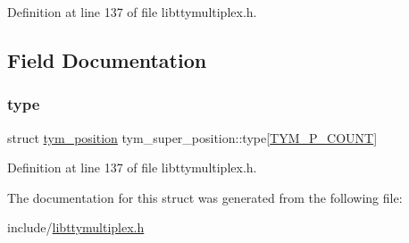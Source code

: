 Definition at line 137 of file libttymultiplex.\+h.



\subsection{Field Documentation}
\mbox{\label{structtym__super__position_af5baedeebbc4d01a742503cf0536617c}} 
\subsubsection{\texorpdfstring{type}{type}}
{\footnotesize\ttfamily struct \hyperlink{structtym__position}{tym\+\_\+position} tym\+\_\+super\+\_\+position\+::type\mbox{[}\hyperlink{libttymultiplex_8h_a23b539c9dc1c137633f8783517fc2653a483bfa59d0a2b43731d992c418a42db7}{T\+Y\+M\+\_\+\+P\+\_\+\+C\+O\+U\+NT}\mbox{]}}



Definition at line 137 of file libttymultiplex.\+h.



The documentation for this struct was generated from the following file\+:\begin{DoxyCompactItemize}
\item 
include/\hyperlink{libttymultiplex_8h}{libttymultiplex.\+h}\end{DoxyCompactItemize}
